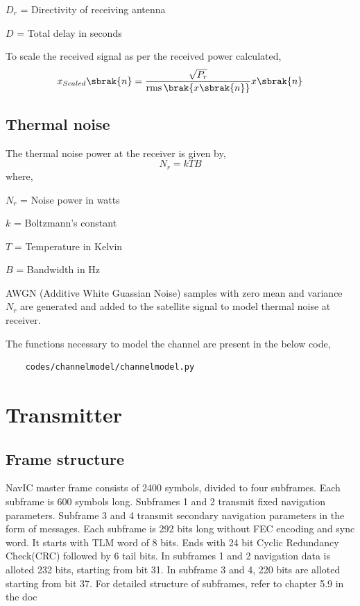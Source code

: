 \documentclass[11pt]{book}
\begin{document}
$D_r$ = Directivity of receiving antenna 

$D$ = Total delay in seconds

To scale the received signal as per the received power calculated,
\begin{equation}
    x_{Scaled}\sbrak{n} = \frac{\sqrt{P_r}}{\operatorname{rms}\brak{x\sbrak{n}}}x\sbrak{n}
\end{equation}   

\section{Thermal noise}
The thermal noise power at the receiver is given by,
\begin{equation}
    N_r = k T B
\end{equation}
where,

$N_r$ = Noise power in watts

$k$ = Boltzmann's constant

$T$ = Temperature in Kelvin

$B$ = Bandwidth in Hz

AWGN (Additive White Guassian Noise) samples with zero mean and variance $N_r$ are generated and added to the satellite signal to model thermal noise at receiver.

The functions necessary to model the channel are present in the below code,
\begin{lstlisting}
    codes/channelmodel/channelmodel.py
\end{lstlisting}

\chapter{Transmitter}

\section{Frame structure}
NavIC master frame consists of 2400 symbols, divided to four subframes. Each subframe is 600 symbols long. Subframes 1 and 2 transmit fixed navigation parameters. Subframe 3 and 4 transmit secondary navigation parameters in the form of messages. Each subframe is 292 bits long without FEC encoding and sync word. It starts with TLM word of 8 bits. Ends with 24 bit Cyclic Redundancy Check(CRC) followed by 6 tail bits. In subframes 1 and 2 navigation data is alloted 232 bits, starting from bit 31. In subframe 3 and 4, 220 bits are alloted starting from bit 37. For detailed structure of subframes, refer to chapter 5.9 in the doc
\end{document}
